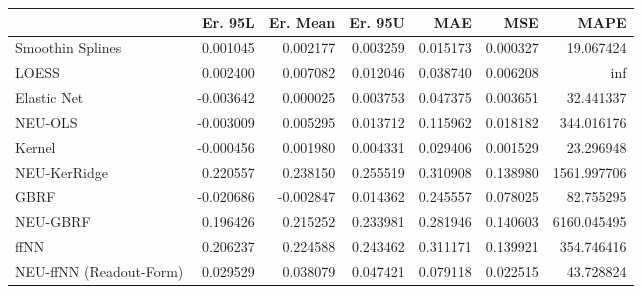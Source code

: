 \begin{tabular}{lrrrrrr}
\toprule
{} &   Er. 95L &  Er. Mean &   Er. 95U &       MAE &       MSE &         MAPE \\
\midrule
Smoothin Splines        &  0.001045 &  0.002177 &  0.003259 &  0.015173 &  0.000327 &    19.067424 \\
LOESS                   &  0.002400 &  0.007082 &  0.012046 &  0.038740 &  0.006208 &          inf \\
Elastic Net             & -0.003642 &  0.000025 &  0.003753 &  0.047375 &  0.003651 &    32.441337 \\
NEU-OLS                 & -0.003009 &  0.005295 &  0.013712 &  0.115962 &  0.018182 &   344.016176 \\
Kernel                  & -0.000456 &  0.001980 &  0.004331 &  0.029406 &  0.001529 &    23.296948 \\
NEU-KerRidge            &  0.220557 &  0.238150 &  0.255519 &  0.310908 &  0.138980 &  1561.997706 \\
GBRF                    & -0.020686 & -0.002847 &  0.014362 &  0.245557 &  0.078025 &    82.755295 \\
NEU-GBRF                &  0.196426 &  0.215252 &  0.233981 &  0.281946 &  0.140603 &  6160.045495 \\
ffNN                    &  0.206237 &  0.224588 &  0.243462 &  0.311171 &  0.139921 &   354.746416 \\
NEU-ffNN (Readout-Form) &  0.029529 &  0.038079 &  0.047421 &  0.079118 &  0.022515 &    43.728824 \\
\bottomrule
\end{tabular}
